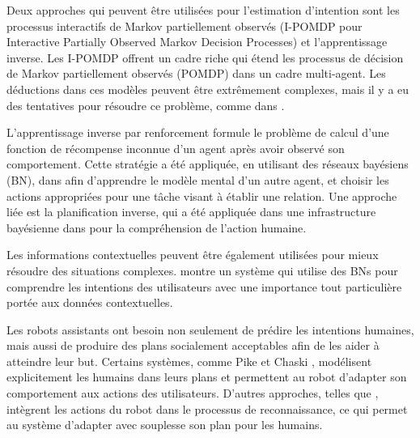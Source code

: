 \documentclass[a4paper,11pt,twoside]{StyleThese}
\begin{document}
Deux approches qui peuvent être utilisées pour l'estimation d'intention sont les processus interactifs de Markov partiellement observés (I-POMDP pour Interactive Partially Observed Markov Decision Processes) et l'apprentissage inverse. Les I-POMDP \cite{gmytrasiewicz2004interactive} offrent un cadre riche qui étend les processus de décision de Markov partiellement observés (POMDP) dans un cadre multi-agent. Les déductions dans ces modèles peuvent être extrêmement complexes, mais il y a eu des tentatives pour résoudre ce problème, comme dans \cite{doshi2009monte, hoang2013interactive}.





L'apprentissage inverse par renforcement \cite{ng2000algorithms} formule le problème de calcul d'une fonction de récompense inconnue d'un agent après avoir observé son comportement. Cette stratégie a été appliquée, en utilisant des réseaux bayésiens (BN), dans \cite{Nagai2015} afin d'apprendre le modèle mental d'un autre agent, et choisir les actions appropriées pour une tâche visant à établir une relation. Une approche liée est la planification inverse, qui a été appliquée dans une infrastructure bayésienne dans \cite{baker2009action} pour la compréhension de l'action humaine.

Les informations contextuelles peuvent être également utilisées pour mieux résoudre des situations complexes. \cite{Liu2014} montre un système qui utilise des BNs pour comprendre les intentions des utilisateurs avec une importance tout particulière portée aux données contextuelles.

Les robots assistants ont besoin non seulement de prédire les intentions humaines, mais aussi de produire des plans socialement acceptables afin de les aider à atteindre leur but. Certains systèmes, comme Pike \cite{karpas2015robust} et Chaski \cite{shah2011improved}, modélisent explicitement les humains dans leurs plans et permettent au robot d'adapter son comportement aux actions des utilisateurs. D'autres approches, telles que \cite{levine2014concurrent}, intègrent les actions du robot dans le processus de reconnaissance, ce qui permet au système d'adapter avec souplesse son plan pour les humains.
\end{document}

